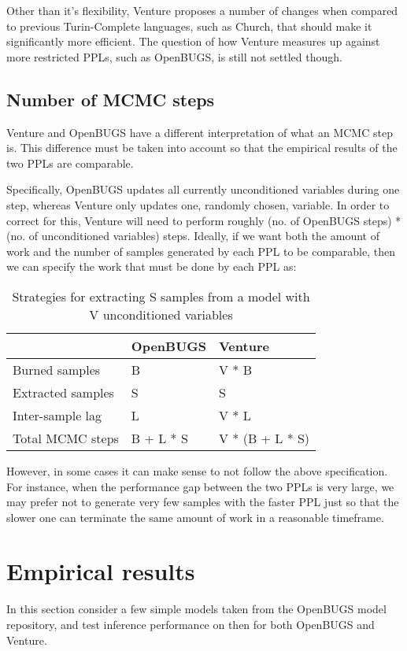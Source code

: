 Other than it's flexibility, Venture proposes a number of changes when compared to previous Turin-Complete languages, such as Church, that should make it significantly more efficient. The question of how Venture measures up against more restricted PPLs, such as OpenBUGS, is still not settled though. 


\subsection{Number of MCMC steps}
Venture and OpenBUGS have a different interpretation of what an MCMC step is. This difference must be taken into account so that the empirical results of the two PPLs are comparable.

Specifically, OpenBUGS updates all currently unconditioned variables during one step, whereas Venture only updates one, randomly chosen, variable. In order to correct for this, Venture will need to perform roughly (no. of OpenBUGS steps) * (no. of unconditioned variables) steps. Ideally, if we want both the amount of work and the number of samples generated by each PPL to be comparable, then we can specify the work that must be done by each PPL as:

\begin{table}[H]
  \centering
  \begin{tabular}{lll}
    \toprule
    & OpenBUGS & Venture \\
    \midrule
    Burned samples & B & V * B \\
    Extracted samples & S & S \\
    Inter-sample lag & L & V * L \\
    Total MCMC steps & B + L * S & V * (B + L * S) \\
    \bottomrule
  \end{tabular}
  \caption{Strategies for extracting S samples from a model with V unconditioned variables}
  \label{tab:noSteps}
\end{table}

However, in some cases it can make sense to not follow the above specification. For instance, when the performance gap between the two PPLs is very large, we may prefer not to generate very few samples with the faster PPL just so that the slower one can terminate the same amount of work in a reasonable timeframe. 

\section{Empirical results}
In this section consider a few simple models taken from the OpenBUGS model repository, and test inference performance on then for both OpenBUGS and Venture. 

